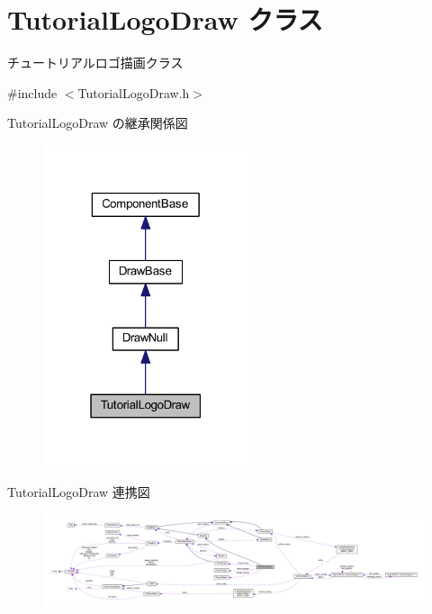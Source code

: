 \hypertarget{class_tutorial_logo_draw}{}\section{Tutorial\+Logo\+Draw クラス}
\label{class_tutorial_logo_draw}


チュートリアルロゴ描画クラス  




{\ttfamily \#include $<$Tutorial\+Logo\+Draw.\+h$>$}



Tutorial\+Logo\+Draw の継承関係図\nopagebreak
\begin{figure}[H]
\begin{center}
\leavevmode
\includegraphics[width=171pt]{class_tutorial_logo_draw__inherit__graph}
\end{center}
\end{figure}


Tutorial\+Logo\+Draw 連携図\nopagebreak
\begin{figure}[H]
\begin{center}
\leavevmode
\includegraphics[width=350pt]{class_tutorial_logo_draw__coll__graph}
\end{center}
\end{figure}
